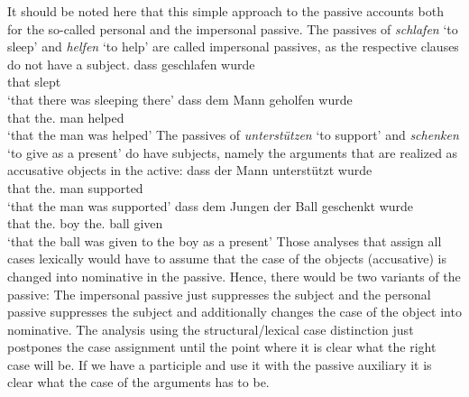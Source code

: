 It should be noted here that this simple approach to the passive accounts both for the so-called
personal and the impersonal passive. The passives of \emph{schlafen} `to sleep' and \emph{helfen}
`to help' are called impersonal passives, as the respective clauses do not have a subject. 
\eal
\ex 
\gll dass geschlafen wurde\\
     that slept      \AUX\\
\glt `that there was sleeping there'
\ex
\gll dass dem Mann geholfen wurde\\
     that the.\DAT{} man helped \AUX\\
\glt `that the man was helped'
\zl
The passives of \emph{unterstützen} `to support' and \emph{schenken} `to give as a present' do have
subjects, namely the arguments that are realized as accusative objects in the active:
\eal
\ex 
\gll dass der Mann unterstützt wurde\\
     that the.\NOM{} man supported \AUX\\
\glt `that the man was supported'
\ex
\gll dass dem Jungen der Ball geschenkt wurde\\
     that the.\DAT{} boy the.\NOM{} ball given \AUX\\
\glt `that the ball was given to the boy as a present'
\zl
Those analyses that assign all cases lexically would have to assume that the case of the objects
(accusative) is changed into nominative in the passive. Hence, there would be two variants of the
passive: The impersonal passive just suppresses the subject and the personal passive suppresses the
subject and additionally changes the case of the object into nominative. The analysis using the
structural/lexical case distinction just postpones the case assignment until the point where it is
clear what the right case will be. If we have a participle and use it with the passive auxiliary it
is clear what the case of the arguments has to be.





